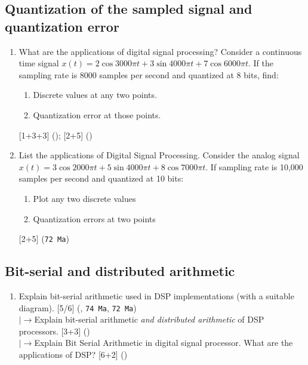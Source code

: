 \documentclass[12pt]{article}
\newcommand{\lb}{\\$\left|\rightarrow\right.$}
\begin{document}
  \subsection{Quantization of the sampled signal and quantization error}
    \begin{enumerate}[topsep=0pt, noitemsep]
      \item What are the applications of digital signal processing? Consider a continuous time signal $x(t)=2\cos 3000\pi t+3\sin 4000\pi t+7\cos 6000\pi t$. If the sampling rate is 8000 samples per second and quantized at 8 bits, find:
        \begin{enumerate}[label=(\alph*), noitemsep, topsep=0pt]
          \item Discrete values at any two points.
          \item Quantization error at those points.
        \end{enumerate}
        \hfill [1+3+3] (); [2+5] ()

      \item List the applications of Digital Signal Processing. Consider the analog signal $x(t)=3\cos 2000\pi t+5\sin 4000\pi t+8\cos 7000\pi t$. If sampling rate is 10,000 samples per second and quantized at 10 bits:
        \begin{enumerate}[label=(\roman*), noitemsep, topsep=0pt]
          \item Plot any two discrete values
          \item Quantization errors at two points
        \end{enumerate}
        \hfill [2+5] (\texttt{72 Ma})
    \end{enumerate}

  \subsection{Bit-serial and distributed arithmetic}
    \begin{enumerate}[topsep=0pt, noitemsep]
      \item Explain bit-serial arithmetic used in DSP implementations (with a suitable diagram). \hfill [5/6] (, \texttt{74 Ma}, \texttt{72 Ma})
        \lb Explain bit-serial arithmetic \emph{and distributed arithmetic} of DSP processors. \hfill [3+3] ()
        \lb Explain Bit Serial Arithmetic in digital signal processor. What are the applications of DSP? \hfill [6+2] ()
    \end{enumerate}
\end{document}
